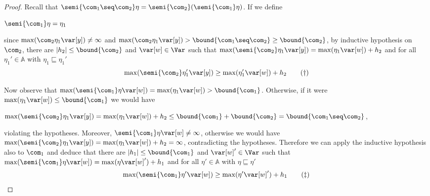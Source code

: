 \begin{proof}
  Recall that
  \(\semi{\com_1 \seq \com_2} \eta = \semi{\com_2}(\semi{\com_1}\eta)\).
  If we define
  \begin{center}
    \(\semi{\com_1} \eta = \eta_1\)
  \end{center}
  since \(\max(\com_2 \eta_1 \var[y]) \neq \infty\) and 
  \(\max(\com_2 \eta_1 \var[y]) > \bound{\com_1 \seq \com_2} \geq
  \bound{\com_2}\), by inductive hypothesis on \(\com_2\), there are
  \(|h_2| \leq \bound{\com_2}\) and \(\var[w] \in \Var\) such that
  \(\max(\semi{\com_2} \eta_1 \var[y]) = \max(\eta_1 \var[w]) + h_2\) and
  for all \(\eta_1' \in \mathbb{A}\) with \(\eta_1 \sqsubseteq \eta_1'\)
  \begin{equation}
    \label{eq:seq2}
    \max(\semi{\com_2} \eta_1' \var[y]) \geq \max(\eta_1' \var[w]) + h_2
    \tag{\dag}
  \end{equation}
  
  Now observe that
  \(\max(\semi{\com_1}\eta \var[w]) = \max(\eta_1 \var[w]) >
  \bound{\com_1}\). Otherwise, if it were \(\max(\eta_1 \var[w]) \leq
  \bound{\com_1}\) we would have
  \begin{center}
    \(\max(\semi{\com_2}\eta_1 \var[y]) = \max(\eta_1 \var[w]) + h_2 \leq
    \bound{\com_1} + \bound{\com_2} = \bound{\com_1 \seq \com_2}\),
  \end{center}
  violating the hypotheses. Moreover,
  \(\semi{\com_1}\eta \var[w] \neq \infty\), otherwise we would have
  \(\max(\semi{\com_2} \eta_1 \var[y]) = \max(\eta_1 \var[w]) + h_2 =
  \infty\), contradicting the hypotheses.  Therefore we can apply the
  inductive hypothesis also to \(\com_1\) and deduce that there are
  \(|h_1| \leq \bound{\com_1}\) and \(\var[w]' \in \Var\) such that
  \(\max(\semi{\com_1} \eta \var[w]) = \max(\eta \var[w]') + h_1\) and
  for all \(\eta' \in \mathbb{A}\) with \(\eta \sqsubseteq \eta'\)
  \begin{equation}
    \label{eq:seq1}
    \max(\semi{\com_1} \eta' \var[w]) \geq \max(\eta' \var[w]') + h_1
    \tag{\ddag}
  \end{equation}


\end{proof}
